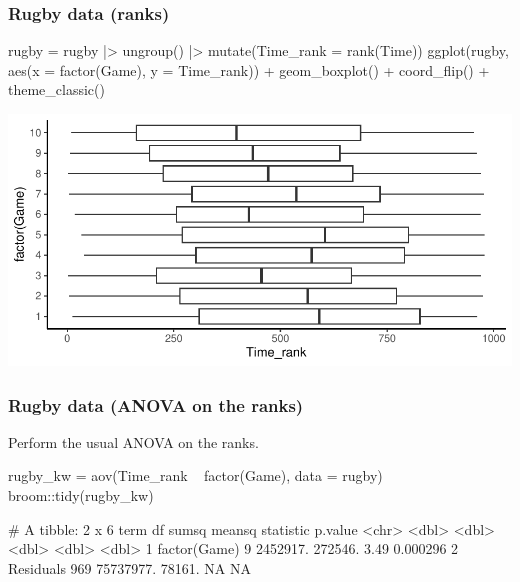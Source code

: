 \documentclass[a4paper]{article}\usepackage[]{graphicx}\usepackage[]{xcolor}
\makeatletter
\def\maxwidth{ %
  \ifdim\Gin@nat@width>\linewidth
    \linewidth
  \else
    \Gin@nat@width
  \fi
}
\makeatother
\begin{document}
\subsubsection{Rugby data (ranks)}
\begin{Schunk}
\begin{Sinput}
rugby = rugby |> ungroup() |> mutate(Time_rank = rank(Time))
ggplot(rugby, aes(x = factor(Game), y = Time_rank)) + 
  geom_boxplot() + coord_flip() +
  theme_classic()
\end{Sinput}


{\centering \includegraphics[width=\maxwidth]{figure/listings-unnamed-chunk-275-1} 

}

\end{Schunk}
\subsubsection{Rugby data (ANOVA on the ranks)}
Perform the usual ANOVA on the ranks.
\begin{Schunk}
\begin{Sinput}
rugby_kw = aov(Time_rank ~ factor(Game), data = rugby)
broom::tidy(rugby_kw)
\end{Sinput}
\begin{Soutput}
# A tibble: 2 x 6
  term            df     sumsq  meansq statistic   p.value
  <chr>        <dbl>     <dbl>   <dbl>     <dbl>     <dbl>
1 factor(Game)     9  2452917. 272546.      3.49  0.000296
2 Residuals      969 75737977.  78161.     NA    NA       
\end{Soutput}
\end{Schunk}
\end{document}
